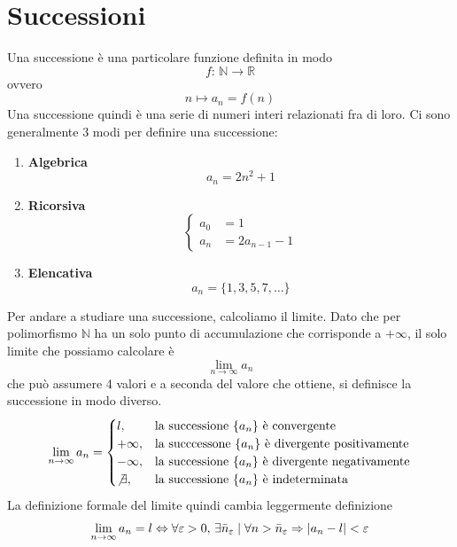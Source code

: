 
\section{Successioni}\label{sec:successioni}
Una successione è una particolare funzione definita in modo
\begin{equation*}
  f:\,\mathbb{N} \rightarrow \mathbb{R} 
\end{equation*}
ovvero
\begin{equation*}
  n \mapsto a_n=f(n)
\end{equation*}
Una successione quindi è una serie di numeri interi relazionati fra di loro. Ci sono generalmente 3
modi per definire una successione:
\begin{enumerate}
  \item \textbf{Algebrica}
    \begin{equation*}
      a_n = 2n^2+1
    \end{equation*}
  \item \textbf{Ricorsiva} 
    \begin{equation*}
      \begin{cases}
        a_0 &= 1\\ a_n &= 2a_{n-1}-1
      \end{cases}
    \end{equation*}
  \item \textbf{Elencativa}
    \begin{equation*}
      a_n=\{1,3,5,7,\ldots\}
    \end{equation*}
\end{enumerate}
Per andare a studiare una successione, calcoliamo il limite. Dato che per polimorfismo $\mathbb{N}$
ha un solo punto di accumulazione che corrisponde a $+\infty$, il solo limite che possiamo calcolare
è
\begin{equation*}
  \lim\limits_{n \to \infty} a_n
\end{equation*}
che può assumere 4 valori e a seconda del valore che ottiene, si definisce la successione in modo
diverso.
\begin{equation*}
  \lim\limits_{n \to \infty} a_n=
  \begin{cases}
    l, &\text{la successione $\{a_n\}$ è convergente}\\
    +\infty, &\text{la succcessone $\{a_n\}$ è divergente positivamente}\\
    -\infty, &\text{la successione $\{a_n\}$ è divergente negativamente}\\
    \not\exists, &\text{la successione $\{a_n\}$ è indeterminata}
  \end{cases}
\end{equation*}
La definizione formale del limite quindi cambia leggermente definizione
\begin{align*}
  \lim\limits_{n \to \infty} a_n=l \Leftrightarrow \forall\varepsilon>0,\,\exists\bar{n}_\varepsilon
  \mid\forall n>\bar{n}_\varepsilon \Rightarrow \lvert a_n-l\rvert<\varepsilon
\end{align*}

